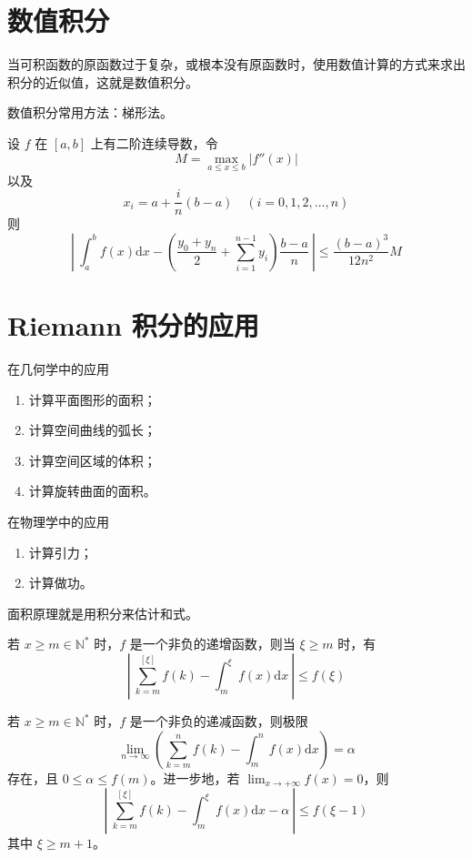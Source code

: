 
\section{数值积分}

当可积函数的原函数过于复杂，或根本没有原函数时，使用数值计算的方式来求出积分的近似值，这就是数值积分。

数值积分常用方法：梯形法。

\begin{theorem}
    设 $f$ 在 $[a, b]$ 上有二阶连续导数，令
    \[M = \max_{a \leqslant x \leqslant b}|f''(x)|\]
    以及
    \[x_i = a + \frac{i}{n}(b - a)\quad (i = 0,1,2, \ldots ,n)\]
    则
    \[\left|\ \int_{a}^{b}f(x)\mathrm{d}x - \left(\frac{y_0 + y_n}{2} + \sum_{i = 1}^{n - 1}y_i\right)\frac{b - a}{n}\ \right| \leqslant \frac{(b - a)^3}{12n^2}M\]
\end{theorem}


\section{Riemann 积分的应用}

在几何学中的应用
\begin{enumerate}
    \item 计算平面图形的面积；
    \item 计算空间曲线的弧长；
    \item 计算空间区域的体积；
    \item 计算旋转曲面的面积。
\end{enumerate}

在物理学中的应用
\begin{enumerate}
    \item 计算引力；
    \item 计算做功。
\end{enumerate}

面积原理就是用积分来估计和式。

\begin{theorem}
    若 $x \geqslant m \in \mathbb{N}^*$ 时，$f$ 是一个非负的递增函数，则当 $\xi \geqslant m$ 时，有
    \[\left|\ \sum_{k = m}^{[\xi]}f(k) - \int_{m}^{\xi}f(x)\mathrm{d}x\ \right| \leqslant f(\xi)\]
\end{theorem}

\begin{theorem}
    若 $x \geqslant m \in \mathbb{N}^*$ 时，$f$ 是一个非负的递减函数，则极限
    \[\lim_{n \to \infty}\left(\sum_{k = m}^{n}f(k) - \int_{m}^{n}f(x)\mathrm{d}x\right) = \alpha\]
    存在，且 $0 \leqslant \alpha \leqslant f(m)$。进一步地，若 $\displaystyle \lim_{x \to +\infty}f(x) = 0$，则
    \[\left|\ \sum_{k = m}^{[\xi]}f(k) - \int_{m}^{\xi}f(x)\mathrm{d}x -\alpha\ \right| \leqslant f(\xi - 1)\]
    其中 $\xi \geqslant m + 1$。
\end{theorem}

